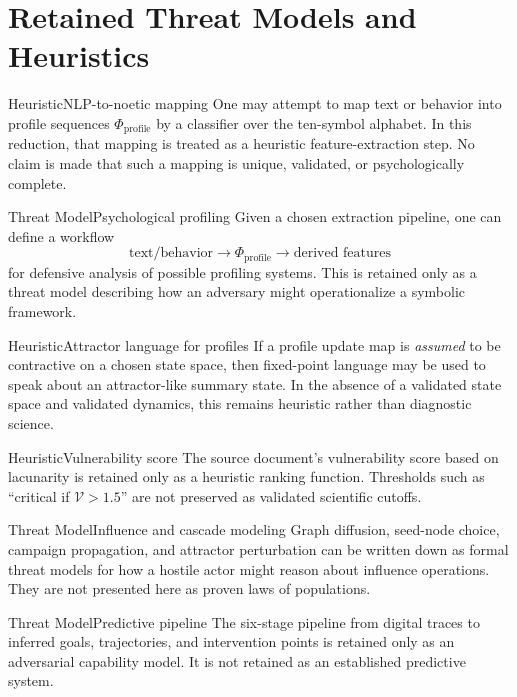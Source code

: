 \documentclass[11pt]{article}
\newcommand{\ProfileFrac}{\Phi_{\mathrm{profile}}}
\newcommand{\VulnScore}{\mathcal{V}}
\theoremstyle{plain}
\begin{document}
\section{Retained Threat Models and Heuristics}

\begin{claimbox}{Heuristic}{NLP-to-noetic mapping}
One may attempt to map text or behavior into profile sequences
$\ProfileFrac$ by a classifier over the ten-symbol alphabet. In this reduction,
that mapping is treated as a heuristic feature-extraction step. No claim is made
that such a mapping is unique, validated, or psychologically complete.
\end{claimbox}

\begin{claimbox}{Threat Model}{Psychological profiling}
Given a chosen extraction pipeline, one can define a workflow
\[
\text{text/behavior} \longrightarrow \ProfileFrac \longrightarrow
\text{derived features}
\]
for defensive analysis of possible profiling systems. This is retained only as a
threat model describing how an adversary might operationalize a symbolic
framework.
\end{claimbox}

\begin{claimbox}{Heuristic}{Attractor language for profiles}
If a profile update map is \emph{assumed} to be contractive on a chosen state
space, then fixed-point language may be used to speak about an attractor-like
summary state. In the absence of a validated state space and validated dynamics,
this remains heuristic rather than diagnostic science.
\end{claimbox}

\begin{claimbox}{Heuristic}{Vulnerability score}
The source document's vulnerability score based on lacunarity is retained only
as a heuristic ranking function. Thresholds such as ``critical if
$\VulnScore>1.5$'' are not preserved as validated scientific cutoffs.
\end{claimbox}

\begin{claimbox}{Threat Model}{Influence and cascade modeling}
Graph diffusion, seed-node choice, campaign propagation, and attractor
perturbation can be written down as formal threat models for how a hostile actor
might reason about influence operations. They are not presented here as proven
laws of populations.
\end{claimbox}

\begin{claimbox}{Threat Model}{Predictive pipeline}
The six-stage pipeline from digital traces to inferred goals, trajectories, and
intervention points is retained only as an adversarial capability model. It is
not retained as an established predictive system.
\end{claimbox}
\end{document}
